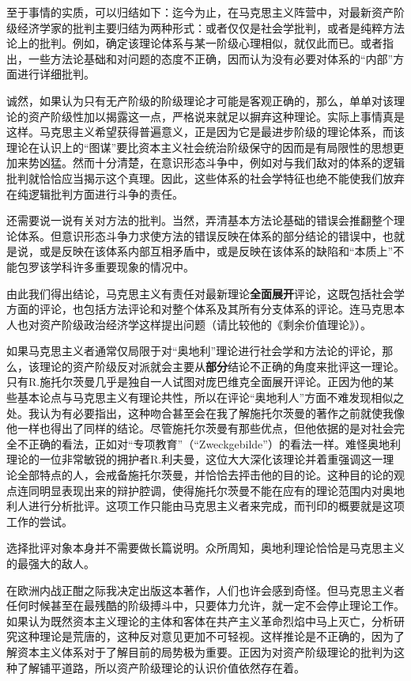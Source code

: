 \documentclass[fontset=fandol, a4paper, 12pt, openright]{ctexbook}
\begin{document}
至于事情的实质，可以归结如下：迄今为止，在马克思主义阵营中，对最新资产阶级经济学家的批判主要归结为两种形式：或者仅仅是社会学批判，或者是纯粹方法论上的批判。例如，确定该理论体系与某一阶级心理相似，就仅此而已。或者指出，一些方法论基础和对问题的态度不正确，因而认为没有必要对体系的“内部”方面进行详细批判。

诚然，如果认为只有无产阶级的阶级理论才可能是客观正确的，那么，单单对该理论的资产阶级性加以揭露这一点，严格说来就足以摒弃这种理论。实际上事情真是这样。马克思主义希望获得普遍意义，正是因为它是最进步阶级的理论体系，而该理论在认识上的“图谋”要比资本主义社会统治阶级保守的因而是有局限性的思想更加来势凶猛。然而十分清楚，在意识形态斗争中，例如对与我们敌对的体系的逻辑批判就恰恰应当揭示这个真理。因此，这些体系的社会学特征也绝不能使我们放弃在纯逻辑批判方面进行斗争的责任。

还需要说一说有关对方法的批判。当然，弄清基本方法论基础的错误会推翻整个理论体系。但意识形态斗争力求使方法的错误反映在体系的部分结论的错误中，也就是说，或是反映在该体系内部互相矛盾中，或是反映在该体系的缺陷和“本质上”不能包罗该学科许多重要现象的情况中。

由此我们得出结论，马克思主义有责任对最新理论\textbf{全面展开}评论，这既包括社会学方面的评论，也包括方法评论和对整个体系及其所有分支体系的评论。连马克思本人也对资产阶级政治经济学这样提出问题（请比较他的《剩余价值理论》）。

如果马克思主义者通常仅局限于对“奥地利”理论进行社会学和方法论的评论，那么，该理论的资产阶级反对派就会主要从\textbf{部分}结论不正确的角度来批评这一理论。只有R.施托尔茨曼几乎是独自一人试图对庞巴维克全面展开评论。正因为他的某些基本论点与马克思主义有理论共性，所以在评论“奥地利人”方面不难发现相似之处。我认为有必要指出，这种吻合甚至会在我了解施托尔茨曼的著作之前就使我像他一样也得出了同样的结论。尽管施托尔茨曼有那些优点，但他依据的是对社会完全不正确的看法，正如对“专项教育”（``Zweckgebilde''）的看法一样。难怪奥地利理论的一位非常敏锐的拥护者R.利夫曼，这位大大深化该理论并着重强调这一理论全部特点的人，会戒备施托尔茨曼，并恰恰去抨击他的目的论。这种目的论的观点连同明显表现出来的辩护腔调，使得施托尔茨曼不能在应有的理论范围内对奥地利人进行分析批评。这项工作只能由马克思主义者来完成，而刊印的概要就是这项工作的尝试。

选择批评对象本身并不需要做长篇说明。众所周知，奥地利理论恰恰是马克思主义的最强大的敌人。

在欧洲内战正酣之际我决定出版这本著作，人们也许会感到奇怪。但马克思主义者任何时候甚至在最残酷的阶级搏斗中，只要体力允许，就一定不会停止理论工作。如果认为既然资本主义理论的主体和客体在共产主义革命烈焰中马上灭亡，分析研究这种理论是荒唐的，这种反对意见更加不可轻视。这样推论是不正确的，因为了解资本主义体系对于了解目前的局势极为重要。正因为对资产阶级理论的批判为这种了解铺平道路，所以资产阶级理论的认识价值依然存在着。
\end{document}

